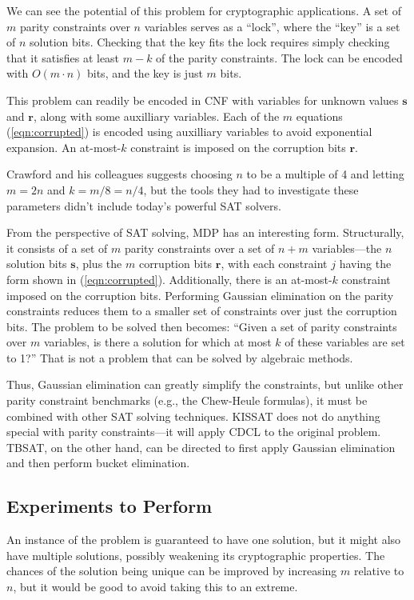 We can see the potential of this problem for cryptographic
applications.  A set of $m$ parity constraints over $n$ variables serves as a ``lock'',
where the ``key'' is a set of $n$ solution bits. 
Checking that
the key fits the lock requires simply checking that it satisfies at least $m-k$ of the parity constraints.
The lock can be encoded
with $O(m \cdot n)$ bits, and the key is just $m$ bits.

This problem can readily be encoded in CNF with variables for
unknown values $\bm{s}$ and $\bm{r}$, along with some auxilliary
variables.  Each of the $m$ equations
(\ref{eqn:corrupted}) is encoded using auxilliary variables to avoid
exponential expansion.  An at-most-$k$ constraint is imposed on the
corruption bits $\bm{r}$.

Crawford and his colleagues suggests choosing $n$ to be a multiple of
4 and letting $m = 2n$ and $k = m/8 = n/4$, but the tools they had to
investigate these parameters didn't include today's powerful SAT
solvers.

From the perspective of SAT solving, MDP has an interesting form.
Structurally, it consists of a set of $m$ parity constraints over a
set of $n+m$ variables---the $n$ solution bits $\bm{s}$, plus the $m$
corruption bits $\bm{r}$, with each constraint $j$ having the form
shown in (\ref{eqn:corrupted}).  Additionally, there is an at-most-$k$
constraint imposed on the corruption bits.  Performing Gaussian
elimination on the parity constraints reduces them to a smaller set of
constraints over just the corruption bits.  The problem to be solved
then becomes: ``Given a set of parity constraints over $m$ variables,
is there a solution for which at most $k$ of these variables are set
to 1?''  That is not a problem that can be solved by algebraic
methods.

Thus, Gaussian elimination can greatly simplify the constraints, but
unlike other parity constraint benchmarks (e.g., the Chew-Heule
formulas), it must be combined with other SAT solving techniques.
KISSAT does not do anything special with parity constraints---it will
apply CDCL to the original problem.  TBSAT, on the other hand, can be
directed to first apply Gaussian elimination and then perform bucket
elimination.

\subsection*{Experiments to Perform}

An instance of the problem is guaranteed to have one solution, but it
might also have multiple solutions, possibly weakening its
cryptographic properties.  The chances of the solution being unique
can be improved by increasing $m$ relative to $n$, but it would be
good to avoid taking this to an extreme.

